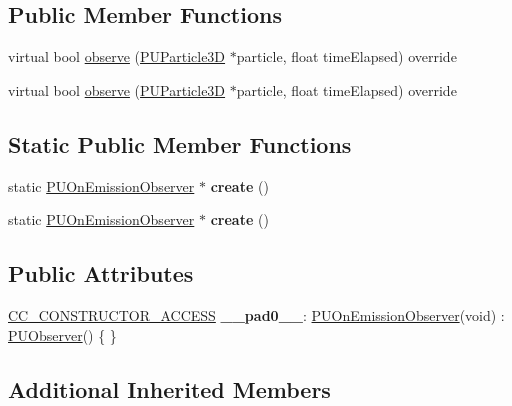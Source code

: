 \subsection*{Public Member Functions}
\begin{DoxyCompactItemize}
\item 
virtual bool \hyperlink{classPUOnEmissionObserver_a8e44d09b84802c78a7cbe671a104962c}{observe} (\hyperlink{structPUParticle3D}{P\+U\+Particle3D} $\ast$particle, float time\+Elapsed) override
\item 
virtual bool \hyperlink{classPUOnEmissionObserver_a943d4b27b5a19b1918a0f7877c5dffb2}{observe} (\hyperlink{structPUParticle3D}{P\+U\+Particle3D} $\ast$particle, float time\+Elapsed) override
\end{DoxyCompactItemize}
\subsection*{Static Public Member Functions}
\begin{DoxyCompactItemize}
\item 
\mbox{\label{classPUOnEmissionObserver_ade78540e77b32f4ce94ee9cdcf0bc498}} 
static \hyperlink{classPUOnEmissionObserver}{P\+U\+On\+Emission\+Observer} $\ast$ {\bfseries create} ()
\item 
\mbox{\label{classPUOnEmissionObserver_ae15397f19ede768cf6496b9fd9a44a77}} 
static \hyperlink{classPUOnEmissionObserver}{P\+U\+On\+Emission\+Observer} $\ast$ {\bfseries create} ()
\end{DoxyCompactItemize}
\subsection*{Public Attributes}
\begin{DoxyCompactItemize}
\item 
\mbox{\label{classPUOnEmissionObserver_abc7bc69249fc6ebc1cb079dcbdb30d5d}} 
\hyperlink{_2cocos2d_2cocos_2base_2ccConfig_8h_a25ef1314f97c35a2ed3d029b0ead6da0}{C\+C\+\_\+\+C\+O\+N\+S\+T\+R\+U\+C\+T\+O\+R\+\_\+\+A\+C\+C\+E\+SS} {\bfseries \+\_\+\+\_\+pad0\+\_\+\+\_\+}\+: \hyperlink{classPUOnEmissionObserver}{P\+U\+On\+Emission\+Observer}(void) \+: \hyperlink{classPUObserver}{P\+U\+Observer}() \{ \}
\end{DoxyCompactItemize}
\subsection*{Additional Inherited Members}


